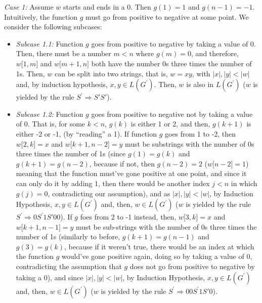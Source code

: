 \documentclass[12pt]{article}
\begin{document}
\textit{Case 1:} Assume \(w\) starts and ends in a 0. Then \(g(1) = 1\) and
\(g(n - 1) = - 1\). Intuitively, the function \(g\) must go from
positive to negative at some point. We consider the following subcases:

\begin{itemize}
\item
  \textit{Subcase 1.1:} Function \(g\) goes from positive to negative by taking a
  value of \(0\). Then, there must be a number \(m < n\) where
  \(g(m) = 0\), and therefore, \(w\lbrack 1,m\rbrack\) and
  \(w\lbrack m + 1,n\rbrack\) both have the number 0s three times the
  number of 1s. Then, \(w\) can be split into two strings, that is,
  \(w = xy\), with \(|x|,|y| < |w|\) and, by induction hypothesis,
  \(x,y \in L\left( G^{'} \right).\) Then, \(w\) is also in
  \(L\left( G^{'} \right)\) (\(w\) is yielded by the rule
  \(S^{'} \Rightarrow S'S'\)).
\item
  \textit{Subcase 1.2:} Function \(g\) goes from positive to negative not by
  taking a value of 0. That is, for some \(k < n\), \(g(k)\) is either 1
  or 2, and then, \(g(k + 1)\) is either -2 or -1, (by ``reading'' a 1).
  If function \(g\) goes from 1 to -2, then \(w\lbrack 2,k\rbrack = x\)
  and \(w\lbrack k + 1,n - 2\rbrack = y\) must be substrings with the
  number of 0s three times the number of 1s (since \(g(1) = g(k)\) and
  \(g(k + 1) = g(n - 2)\), because if not, then \(g(n - 2) = 2\)
  (\(w\lbrack n - 2\rbrack = 1\)) meaning that the function must've gone
  positive at one point, and since it can only do it by adding 1, then
  there would be another index \(j < n\) in which \(g(j) = 0\),
  contradicting our assumption), and as \(|x|,|y| < |w|\), by Induction
  Hypothesis, \(x,y \in L(G^{'})\) and, then,
  \(w \in L\left( G^{'} \right)\) (\(w\) is yielded by the rule
  \(S^{'} \Rightarrow 0S^{'}1S'00\)). If \(g\) foes from 2 to -1
  instead, then, \(w\lbrack 3,k\rbrack = x\) and
  \(w\lbrack k + 1,n - 1\rbrack = y\) must be sub-strings with the number
  of 0s three times the number of 1s (similarly to before,
  \(g(k + 1) = g(n - 1)\) and \(g(3) = g(k)\), because if it weren't
  true, there would be an index at which the function \(g\) would've
  gone positive again, doing so by taking a value of 0, contradicting
  the assumption that \(g\) does not go from positive to negative by
  taking a 0), and since \(|x|,|y| < |w|\), by Induction Hypothesis,
  \(x,y \in L(G^{'})\) and, then, \(w \in L\left( G^{'} \right)\) (\(w\)
  is yielded by the rule \(S^{'} \Rightarrow 00S^{'}1S'0\)).
\end{itemize}
\end{document}
